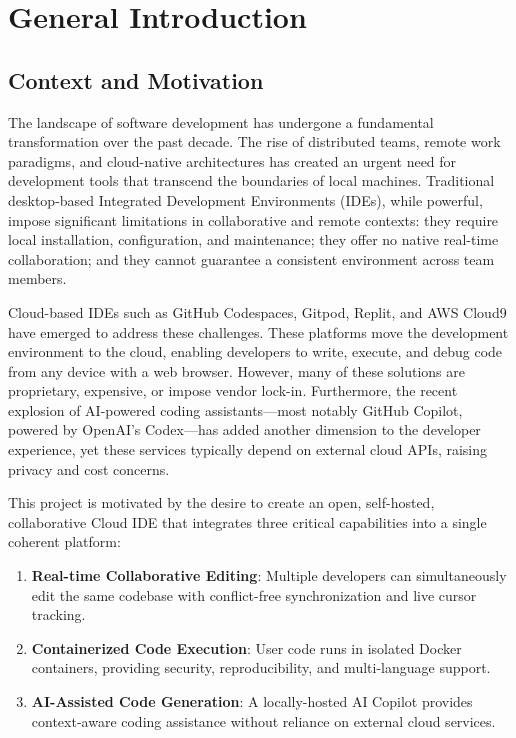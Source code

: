 \documentclass[12pt,a4paper,oneside]{report}
\begin{document}
\newpage
{}
\onehalfspacing

\chapter{General Introduction}

\section{Context and Motivation}

The landscape of software development has undergone a fundamental transformation over the past decade. The rise of distributed teams, remote work paradigms, and cloud-native architectures has created an urgent need for development tools that transcend the boundaries of local machines. Traditional desktop-based Integrated Development Environments (IDEs), while powerful, impose significant limitations in collaborative and remote contexts: they require local installation, configuration, and maintenance; they offer no native real-time collaboration; and they cannot guarantee a consistent environment across team members.

Cloud-based IDEs such as GitHub Codespaces, Gitpod, Replit, and AWS Cloud9 have emerged to address these challenges. These platforms move the development environment to the cloud, enabling developers to write, execute, and debug code from any device with a web browser. However, many of these solutions are proprietary, expensive, or impose vendor lock-in. Furthermore, the recent explosion of AI-powered coding assistants---most notably GitHub Copilot, powered by OpenAI's Codex---has added another dimension to the developer experience, yet these services typically depend on external cloud APIs, raising privacy and cost concerns.

This project is motivated by the desire to create an open, self-hosted, collaborative Cloud IDE that integrates three critical capabilities into a single coherent platform:

\begin{enumerate}[label=\arabic*.]
    \item \textbf{Real-time Collaborative Editing}: Multiple developers can simultaneously edit the same codebase with conflict-free synchronization and live cursor tracking.
    \item \textbf{Containerized Code Execution}: User code runs in isolated Docker containers, providing security, reproducibility, and multi-language support.
    \item \textbf{AI-Assisted Code Generation}: A locally-hosted AI Copilot provides context-aware coding assistance without reliance on external cloud services.
\end{enumerate}
\end{document}
